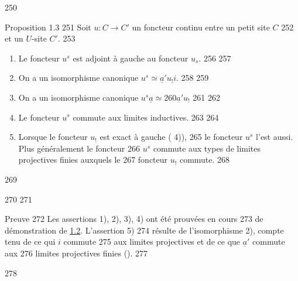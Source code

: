    250	\begin{enonce*}{Proposition 1.3}
   251	Soit $u:C\rightarrow C'$ un foncteur continu entre un petit site $C$
   252	et un $U$-site $C'$.
   253	\begin{enumerate}
   254	\renewcommand{\labelenumi}{\theenumi)}
   255	\item Le foncteur $u^s$ est adjoint à gauche au foncteur $u_s$.
   256	
   257	\item On a un isomorphisme canonique $u^s\simeq \underline{a}'u_{!}i$.
   258	
   259	\item On a un isomorphisme canonique $u^s\underline{a}\simeq
   260	  \underline{a}'u_{!}$
   261	
   262	\item Le foncteur $u^s$ commute aux limites inductives.
   263	
   264	\item Lorsque le foncteur $u_{!}$ est exact à gauche (\cf {} 4)),
   265	  le foncteur $u^s$ l'est aussi. Plus généralement le foncteur
   266	  $u^s$ commute aux types de limites projectives finies auxquels le
   267	  foncteur $u_{!}$ commute.
   268	\end{enumerate}
   269	\end{enonce*}
   270	
   271	\begin{enonce*}[remark]{Preuve}
   272	Les assertions 1), 2), 3), 4) ont été prouvées en cours
   273	de démonstration de \hyperref[III.prop1.2]{1.2}. L'assertion 5)
   274	résulte de l'isomorphisme 2), compte tenu de ce qui $i$ commute
   275	aux limites projectives et de ce que $\underline{a}'$ commute aux
   276	limites projectives finies ().
   277	\end{enonce*}
   278	
